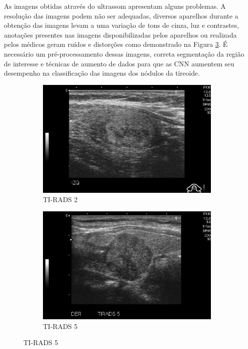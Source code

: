 \documentclass[12pt]{article}
\begin{document}
As imagens obtidas através do ultrassom apresentam alguns problemas. A resolução das imagens podem não ser adequadas, diversos aparelhos durante a obtenção das imagens levam a uma variação de tons de cinza, luz e contrastes, anotações presentes nas imagens disponibilizadas pelos aparelhos ou realizada pelos médicos geram ruídos e distorções como demonstrado na Figura \ref{fig:tfull}. É necessário um pré-processamento dessas imagens, correta segmentação da região de interesse e técnicas de aumento de dados para que as CNN aumentem seu desempenho na classificação das imagens dos nódulos da tireoide.

\begin{figure}[t]
\centering
\caption{Imagens de ultrassom em diferentes classificações dos nódulos da tireoide.}
\begin{subfigure}[t]{.55\textwidth}
  \centering
  \includegraphics[width=1\linewidth]{images/t_2.jpg}
  \caption{TI-RADS 2}
  \label{fig:t2}
\end{subfigure}

\begin{subfigure}[t]{.55\textwidth}
  \centering
  \includegraphics[width=1\linewidth]{images/t_5.jpg}
  \caption{TI-RADS 5}
  \label{fig:t5}
\end{subfigure}
\label{fig:tfull}
\end{figure}
\end{document}
